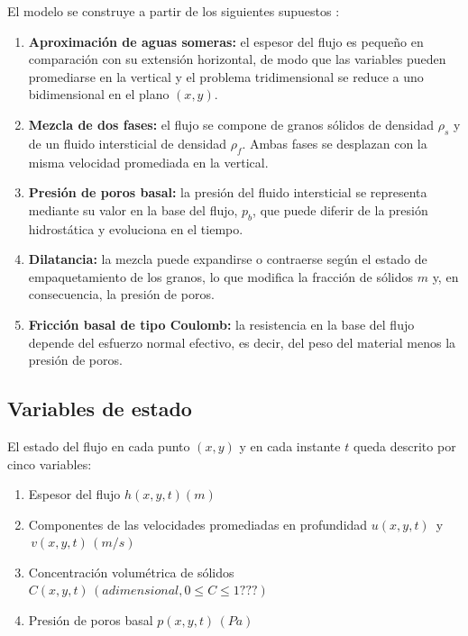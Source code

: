 El modelo se construye a partir de los siguientes supuestos \cite{iverson2014depth}:

\begin{enumerate}
    \item \textbf{Aproximación de aguas someras:} el espesor del flujo es pequeño en comparación con su extensión horizontal, de modo que las variables pueden promediarse en la vertical y el problema tridimensional se reduce a uno bidimensional en el plano $(x,y)$.
    \item \textbf{Mezcla de dos fases:} el flujo se compone de granos sólidos de densidad $\rho_s$ y de un fluido intersticial de densidad $\rho_f$. Ambas fases se desplazan con la misma velocidad promediada en la vertical.
    \item \textbf{Presión de poros basal:} la presión del fluido intersticial se representa mediante su valor en la base del flujo, $p_b$, que puede diferir de la presión hidrostática y evoluciona en el tiempo.
    \item \textbf{Dilatancia:} la mezcla puede expandirse o contraerse según el estado de empaquetamiento de los granos, lo que modifica la fracción de sólidos $m$ y, en consecuencia, la presión de poros.
    \item \textbf{Fricción basal de tipo Coulomb:} la resistencia en la base del flujo depende del esfuerzo normal efectivo, es decir, del peso del material menos la presión de poros.
\end{enumerate}


\subsection{Variables de estado}
\label{subsec:variables}

El estado del flujo en cada punto $(x,y)$ y en cada instante $t$ queda descrito por cinco variables: 
\begin{enumerate}
    \item Espesor del flujo $h(x,y,t) (m)$
    \item Componentes de las velocidades promediadas en profundidad $u(x,y,t)\,$ y $\,v(x,y,t)\,(m/s)$
    \item Concentración volumétrica de sólidos $C(x,y,t)\, (adimensional, 0 \leq C \leq 1???)$
    \item Presión de poros basal $p(x,y,t)\, (Pa)$
\end{enumerate}

